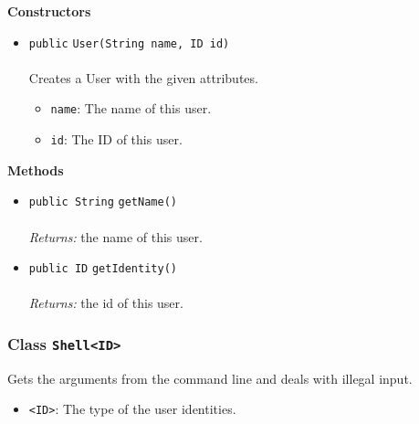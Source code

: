 \textbf{\sffamily Constructors}
\begin{itemize}
\item \lstinline|public| \lstinline|User|\lstinline|(String name, ID id)|\\ \\[-0.6em]
Creates a User with the given attributes.
\begin{itemize}
\item \lstinline|name|: The name of this user.
\item \lstinline|id|: The ID of this user.
\end{itemize}



\end{itemize}


\textbf{\sffamily Methods}
\begin{itemize}
\item \lstinline|public String| \lstinline|getName|\lstinline|()|\\ \\[-0.6em]
\emph{Returns:} the name of this user.



\item \lstinline|public ID| \lstinline|getIdentity|\lstinline|()|\\ \\[-0.6em]
\emph{Returns:} the id of this user.



\end{itemize}

\subsubsection{Class \lstinline|Shell<ID>|}
Gets the arguments from the command line and deals with illegal input. \\
\noindent\begin{minipage}[t]{5cm}
\vspace{0.3em}
\hspace*{2em}
\vspace{0.3em}
\end{minipage}

\begin{itemize}
\item \lstinline|<ID>|: The type of the user identities.
\end{itemize}


